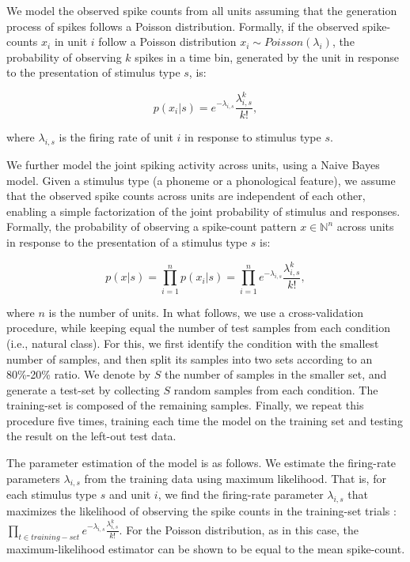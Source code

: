 We model the observed spike counts from all units assuming that the generation process of spikes follows a Poisson distribution. Formally, if the observed spike-counts $x_i$ in unit $i$ follow a Poisson distribution $x_i \sim Poisson(\lambda_i)$, the probability of observing $k$ spikes in a time bin, generated by the unit in response to the presentation of stimulus type $s$, is:

\begin{equation}
    p(x_i|s)=e^{-\lambda_{i,s}}\frac{\lambda_{i,s}^k}{k!},
\end{equation}

where $\lambda_{i,s}$ is the firing rate of unit $i$ in response to stimulus type $s$. 

We further model the joint spiking activity across units, using a Naive Bayes model. Given a stimulus type (a phoneme or a phonological feature), we assume that the observed spike counts across units are independent of each other, enabling a simple factorization of the joint probability of stimulus and responses. Formally, the probability of observing a spike-count pattern $x \in \mathbb{N}^n$ across units in response to the presentation of a stimulus type $s$ is:

\begin{equation}
    p(x|s)=\prod_{i=1}^n{p(x_i |s)}=\prod_{i=1}^n{e^{-\lambda_{i,s}}\frac{\lambda_{i,s}^k}{k!}},
\end{equation}

where $n$ is the number of units. In what follows, we use a cross-validation procedure, while keeping equal the number of test samples from each condition (i.e., natural class). For this, we first identify the condition with the smallest number of samples, and then split its samples into two sets according to an 80\%-20\% ratio. We denote by $S$ the number of samples in the smaller set, and generate a test-set by collecting $S$ random samples from each condition. The training-set is composed of the remaining samples. Finally, we repeat this procedure five times, training each time the model on the training set and testing the result on the left-out test data.

The parameter estimation of the model is as follows. We estimate the firing-rate parameters $\lambda_{i,s}$ from the training data using maximum likelihood. That is, for each stimulus type $s$ and unit $i$, we find the firing-rate parameter $\lambda_{i,s}$ that maximizes the likelihood of observing the spike counts in the training-set trials :$\prod_{t \in training-set}{e^{-\lambda_{i,s}}\frac{\lambda_{i,s}^k}{k!}}$. For the Poisson distribution, as in this case, the maximum-likelihood estimator can be shown to be equal to the mean spike-count.
 

